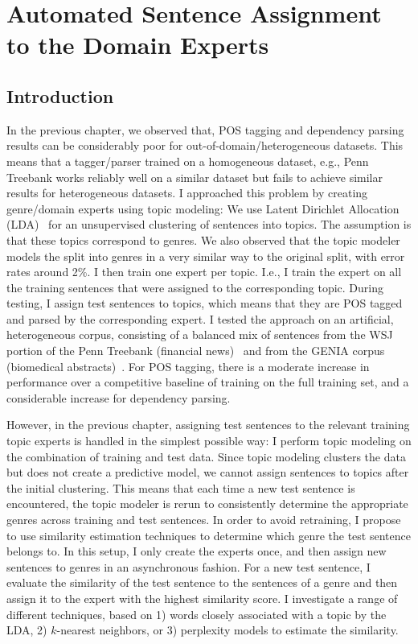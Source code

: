\chapter{Automated Sentence Assignment to the Domain Experts}

\section{Introduction}

In the previous chapter, we observed that, POS tagging and dependency parsing results can be considerably poor for out-of-domain/heterogeneous datasets. This means that a tagger/parser trained on a homogeneous dataset, e.g., Penn Treebank works reliably well on a similar dataset but fails to achieve similar results for heterogeneous datasets. I approached this problem by creating genre/domain experts using topic modeling: We use Latent Dirichlet Allocation (LDA)~\citep{Blei:2003:LDA:944919.944937,Blei:2012:PTM:2133806.2133826} for an unsupervised clustering of  sentences into topics. The assumption is that these topics correspond to genres. We also observed that the topic modeler models the split into genres in a very similar way to the original split, with error rates around 2\%. I then train one expert per topic. I.e., I train the expert on all the training sentences that were assigned to the corresponding topic. During testing, I assign test sentences to topics, which means that they are POS tagged and parsed by the corresponding expert.  I tested the approach on an artificial, heterogeneous corpus, consisting of a balanced mix of sentences from the WSJ portion of the Penn Treebank (financial news)~\citep{marcus:kim:ea:94} and from the GENIA corpus (biomedical abstracts)~\citep{tateisi:tsujii:04}. For POS tagging, there is a moderate increase in performance over a competitive baseline of training on the full training set, and a considerable increase for dependency parsing.

However, in the previous chapter,  assigning test sentences to the relevant training topic experts is handled in the simplest possible way: I perform topic modeling on the combination of training and test data. Since topic modeling clusters the data but does not create a predictive model, we cannot assign sentences to topics after the initial clustering. This means that each time a new test sentence is encountered, the topic modeler is rerun to consistently determine the appropriate genres across training and test sentences. In order to avoid retraining, I propose to use similarity estimation techniques to determine which genre the test sentence belongs to. In this setup, I only create the experts once, and then assign new sentences to genres in an asynchronous fashion. 
For a new test sentence, I evaluate the similarity of the test sentence to the sentences of a genre and then assign it to the expert with the highest similarity score. I investigate a range of different techniques, based on 1) words closely associated with a topic by the LDA, 2) $k$-nearest neighbors, or 3) perplexity models to estimate the similarity. 

